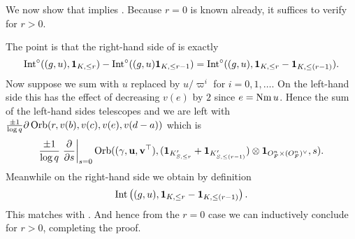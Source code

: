 We now show that  implies .
Because $r = 0$ is known already, it suffices to verify for $r > 0$.

The point is that the right-hand side of  is exactly
\[ \operatorname{Int}^\circ((g,u), \mathbf{1}_{K, \le r}) - \operatorname{Int}^\circ((g,u) \mathbf{1}_{K, \le r-1})
  = \operatorname{Int}^\circ((g,u), \mathbf{1}_{K, \le r} - \mathbf{1}_{K, \le (r-1)}). \]
Now suppose we sum  with $u$ replaced by
$u/\varpi^i$ for $i = 0, 1, \dots$.
On the left-hand side this has the effect of decreasing $v(e)$ by $2$ since $e = \operatorname{Nm} u$.
Hence the sum of the left-hand sides telescopes and we are left with
$\frac{\pm1}{\log q}\partial\operatorname{Orb}(r, v(b), v(c), v(e), v(d-a))$
which is
\[ \frac{\pm 1}{\log q}\left. \pdv{}{s} \right\rvert_{s=0}
  \operatorname{Orb}({(\gamma, \mathbf u, \mathbf v^\top)}, (\mathbf{1}_{K'_{S, \le r}} + \mathbf{1}_{K'_{S, \le (r-1)}}) \otimes \mathbf{1}_{O_F^n \times (O_F^n)^\vee}, s). \]
Meanwhile on the right-hand side we obtain by definition
\[ \operatorname{Int}\left((g,u), \mathbf{1}_{K, \le r} - \mathbf{1}_{K, \le (r-1)}\right). \]
This matches with .
And hence from the $r = 0$ case we can inductively conclude
 for $r > 0$, completing the proof.
